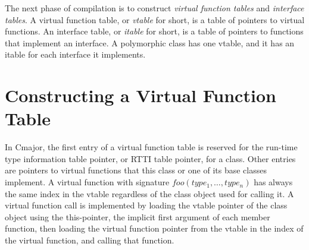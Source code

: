 \documentclass[a4paper,oneside,11pt]{book}
\theoremstyle{definition}
\begin{document}
The next phase of compilation is to construct \emph{virtual function tables} and \emph{interface tables}.
A virtual function table, or \emph{vtable} for short, is a table of pointers to virtual functions.
An interface table, or \emph{itable} for short, is a table of pointers to functions that implement an interface.
A polymorphic class has one vtable, and it has an itable for each interface it implements.

\section{Constructing a Virtual Function Table}

In Cmajor, the first entry of a virtual function table is reserved for the run-time type information table pointer, or RTTI table pointer, for a class.
Other entries are pointers to virtual functions that this class or one of its base classes implement.
A virtual function with signature $foo(type_1, \ldots, type_n)$ has always the same index in the vtable regardless of the class object used for calling it.
A virtual function call is implemented by loading the vtable pointer of the class object using the this-pointer,
the implicit first argument of each member function, then loading the virtual function pointer from the vtable in the index of the virtual function,
and calling that function.
\end{document}
